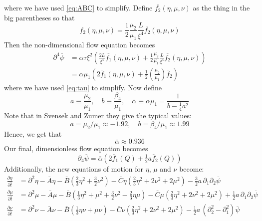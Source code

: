 \documentclass[reqno]{article}
\begin{document}
	where we have used \eqref{eq:ABC} to simplify. Define $\overline{f_2}(\eta, \mu, \nu)$ as the thing in the big parentheses so that
	\begin{equation}
		f_2(\eta, \mu, \nu) = \frac12 \frac{\mu_2}{\mu_1} \frac{L}{\xi^4} \overline{f_2}(\eta, \mu, \nu)
	\end{equation}
	Then the non-dimensional flow equation becomes
	\begin{equation}
	\begin{split}
		\partial^4 \overline{\psi}
		&= \alpha \tau \xi^2 \left(
		\frac{2L}{\xi^4} \overline{f_1}(\eta, \mu, \nu)
		+ \frac12 \frac{\mu_2}{\mu_1} \frac{L}{\xi^4} \overline{f_2}(\eta, \mu, \nu)
		\right) \\
		&= \alpha \mu_1 \left(
		2 \overline{f}_1 (\eta, \mu, \nu)
		+ \frac12 \left( \frac{\mu_2}{\mu_1} \right) \overline{f}_2
		\right)
	\end{split}
	\end{equation}
	where we have used \eqref{eq:tau} to simplify. Now define
	\begin{equation} \label{eq:dimensionless-constants}
		a \equiv \frac{\mu_2}{\mu_1},
		\quad
		b \equiv \frac{\beta_4}{\mu_1},
		\quad
		\overline{\alpha} \equiv \alpha \mu_1
		= \frac{1}{b - \tfrac14 a^2}
	\end{equation}
	Note that in Svensek and Zumer they give the typical values:
	\begin{equation}
		a = \mu_2/\mu_1 \approx -1.92,
		\quad b = \beta_4/\mu_1 \approx 1.99
	\end{equation}
	Hence, we get that
	\begin{equation}
		\overline{\alpha} \approx 0.936
	\end{equation}
	Our final, dimensionless flow equation becomes
	\begin{equation}
		\partial_4 \overline{\psi}
		= \overline{\alpha} \left(
		2 \overline{f}_1 (Q)
		+ \tfrac12 a \overline{f}_2 (Q)
		\right)
	\end{equation}
	Additionally, the new equations of motion for $\eta$, $\mu$ and $\nu$ become:
	\begin{equation}\label{eq:dimensionless-flow-eoms}
	\begin{split}
		\frac{\partial \eta}{\partial \bar{t}} &= \partial^2 \eta - \bar{A}\eta - \bar{B}\left( \tfrac 23 \eta^2 + \tfrac 32 \nu^2\right) - \bar{C} \eta \left( \tfrac23 \eta^2 + 2\nu^2 + 2\mu^2\right) - \tfrac32 a\,\partial_1 \partial_2 \overline{\psi} \\
		\frac{\partial \mu}{\partial \bar{t}} &= \partial^2 \mu - \bar{A}\mu - \bar{B}\left( \tfrac13 \eta^2 + \mu^2 + \tfrac32 \nu^2 - \tfrac23 \eta \mu \right) - \bar{C}\mu\left(\tfrac23 \eta^2 + 2\nu^2 + 2\mu^2\right) + \tfrac12 a\,\partial_1 \partial_2 \overline{\psi} \\
		\frac{\partial \nu}{\partial \bar{t}} &= \partial^2 \nu - \bar{A}\nu - \bar{B}\left( \tfrac13\eta\nu + \mu\nu \right) - \bar{C}\nu\left(\tfrac23\eta^2 + 2\nu^2 + 2\mu^2\right)
		- \tfrac12 a\, \left( \partial_2^2 - \partial_1^2 \right)
		\overline{\psi}
	\end{split}
	\end{equation}
	
\end{document}
